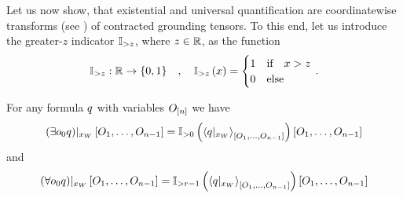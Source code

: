 Let us now show, that existential and universal quantification are coordinatewise transforms (see ) of contracted grounding tensors.
To this end, let us introduce the greater-$z$ indicator $\mathbb{I}_{>z}$, where $z\in\mathbb{R}$, as the function
\begin{align*}
    \mathbb{I}_{>z} : \mathbb{R} \rightarrow \{0,1\}
    \quad, \quad \mathbb{I}_{>z}\left(x\right) =
    \begin{cases}
        1 & \text{if}\quad x > z\\
        0 & \text{else}
    \end{cases} \, .
\end{align*}

\begin{theorem}
    For any formula $q$ with variables $O_{[n]}$ we have
    \begin{align*}
        {\left(\exists{o_{0}}q\right)}|_{x_{W}} \left[O_{1},\ldots,O_{n-1}\right] =
        {\mathbb{I}_{>0}}\left(\left\langle {q}|_{x_{W}}\right\rangle_{\left[ O_{1},\ldots,O_{n-1} \right]}\right)\left[O_{1},\ldots,O_{n-1}\right]
    \end{align*}
    and
    \begin{align*}
        {\left(\forall{{o_{0}}} q\right)}|_{x_{W}} \left[O_{1},\ldots,O_{n-1}\right]=
        {\mathbb{I}_{>r-1}}\left(\left\langle {q}|_{x_{W}}\right\rangle_{\left[ O_{1},\ldots,O_{n-1} \right]}\right)\left[O_{1},\ldots,O_{n-1}\right]
    \end{align*}
\end{theorem}
